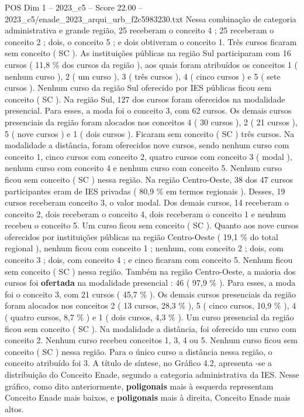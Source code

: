 \begin{textsample}{POS Dim 1 – 2023\_c5 – Score 22.00 – 2023\_c5/enade\_2023\_arqui\_urb\_f2c5983230.txt}
Nessa combinação de categoria administrativa e grande região, 25 receberam o conceito 4 ; 25 receberam o conceito 2 ; dois, o conceito 5 ; e dois obtiveram o conceito 1.
Três cursos ficaram sem conceito ( SC ).
As instituições públicas na região Sul participaram com 16 cursos ( 11,8 \% dos cursos da região ), aos quais foram atribuídos os conceitos 1 ( nenhum curso ), 2 ( um curso ), 3 ( três cursos ), 4 ( cinco cursos ) e 5 ( sete cursos ).
Nenhum curso da região Sul oferecido por IES públicas ficou sem conceito ( SC ).
Na região Sul, 127 dos cursos foram oferecidos na modalidade presencial.
Para esses, a moda foi o conceito 3, com 62 cursos.
Os demais cursos presenciais da região foram alocados nos conceitos 4 ( 30 cursos ), 2 ( 21 cursos ), 5 ( nove cursos ) e 1 ( dois cursos ).
Ficaram sem conceito ( SC ) três cursos.
Na modalidade a distância, foram oferecidos nove cursos, sendo nenhum curso com conceito 1, cinco cursos com conceito 2, quatro cursos com conceito 3 ( modal ), nenhum curso com conceito 4 e nenhum curso com conceito 5.
Nenhum curso ficou sem conceito ( SC ) nessa região.
Na região Centro-Oeste, 38 dos 47 cursos participantes eram de IES privadas ( 80,9 \% em termos regionais ).
Desses, 19 cursos receberam conceito 3, o valor modal.
Dos demais cursos, 14 receberam o conceito 2, dois receberam o conceito 4, dois receberam o conceito 1 e nenhum recebeu o conceito 5.
Um curso ficou sem conceito ( SC ).
Quanto aos nove cursos oferecidos por instituições públicas na região Centro-Oeste ( 19,1 \% do total regional ), nenhum ficou com conceito 1 ; nenhum, com conceito 2 ; dois, com conceito 3 ; dois, com conceito 4 ; e cinco ficaram com conceito 5.
Nenhum ficou sem conceito ( SC ) nessa região.
Também na região Centro-Oeste, a maioria dos cursos foi \textbf{ofertada} na modalidade presencial : 46 ( 97,9 \% ).
Para esses, a moda foi o conceito 3, com 21 cursos ( 45,7 \% ).
Os demais cursos presenciais da região foram alocados nos conceitos 2 ( 13 cursos, 28,3 \% ), 5 ( cinco cursos, 10,9 \% ), 4 ( quatro cursos, 8,7 \% ) e 1 ( dois cursos, 4,3 \% ).
Um curso presencial da região ficou sem conceito ( SC ).
Na modalidade a distância, foi oferecido um curso com conceito 2.
Nenhum curso recebeu conceitos 1, 3, 4 ou 5.
Nenhum curso ficou sem conceito ( SC ) nessa região.
Para o único curso a distância nessa região, o conceito atribuído foi 3.
A título de síntese, no Gráfico 4.2, apresenta -se a distribuição do Conceito Enade, segundo a categoria administrativa da IES.
Nesse gráfico, como dito anteriormente, \textbf{poligonais} mais à esquerda representam Conceito Enade mais baixos, e \textbf{poligonais} mais à direita, Conceito Enade mais altos.

\end{textsample}
